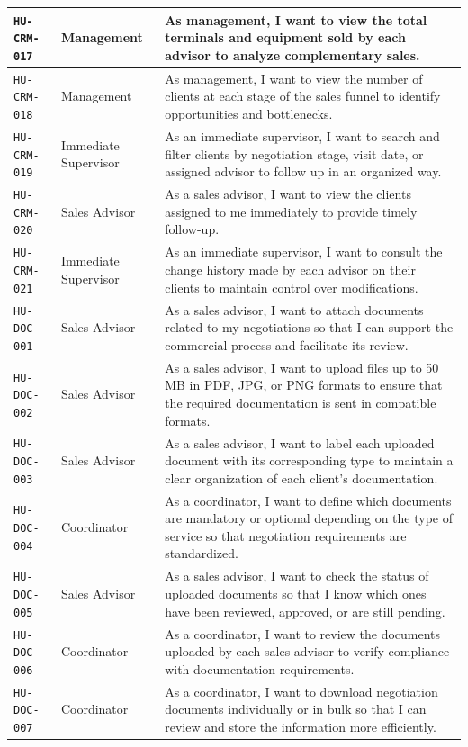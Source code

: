 \documentclass[letterpaper%
, oneside%
, 12pt%
, memoireprojet%
, english%
,creativecommons,hyperref, withAlgo2e %
]{thETS}
\begin{document}
\begin{longtable}{|L{2.5cm}|L{3.2cm}|L{7.9cm}|}
\hline
\texttt{HU-CRM-017} & Management & As management, I want to view the total terminals and equipment sold by each advisor to analyze complementary sales. \\
\hline
\texttt{HU-CRM-018} & Management & As management, I want to view the number of clients at each stage of the sales funnel to identify opportunities and bottlenecks. \\
\hline
\texttt{HU-CRM-019} & Immediate Supervisor & As an immediate supervisor, I want to search and filter clients by negotiation stage, visit date, or assigned advisor to follow up in an organized way. \\
\hline
\texttt{HU-CRM-020} & Sales Advisor & As a sales advisor, I want to view the clients assigned to me immediately to provide timely follow-up. \\
\hline
\texttt{HU-CRM-021} & Immediate Supervisor & As an immediate supervisor, I want to consult the change history made by each advisor on their clients to maintain control over modifications. \\
\hline
\texttt{HU-DOC-001} & Sales Advisor & As a sales advisor, I want to attach documents related to my negotiations so that I can support the commercial process and facilitate its review. \\
\hline
\texttt{HU-DOC-002} & Sales Advisor & As a sales advisor, I want to upload files up to 50 MB in PDF, JPG, or PNG formats to ensure that the required documentation is sent in compatible formats. \\
\hline
\texttt{HU-DOC-003} & Sales Advisor & As a sales advisor, I want to label each uploaded document with its corresponding type to maintain a clear organization of each client’s documentation. \\
\hline
\texttt{HU-DOC-004} & Coordinator & As a coordinator, I want to define which documents are mandatory or optional depending on the type of service so that negotiation requirements are standardized. \\
\hline
\texttt{HU-DOC-005} & Sales Advisor & As a sales advisor, I want to check the status of uploaded documents so that I know which ones have been reviewed, approved, or are still pending. \\
\hline
\texttt{HU-DOC-006} & Coordinator & As a coordinator, I want to review the documents uploaded by each sales advisor to verify compliance with documentation requirements. \\
\hline
\texttt{HU-DOC-007} & Coordinator & As a coordinator, I want to download negotiation documents individually or in bulk so that I can review and store the information more efficiently. \\

\end{longtable}
\end{document}

